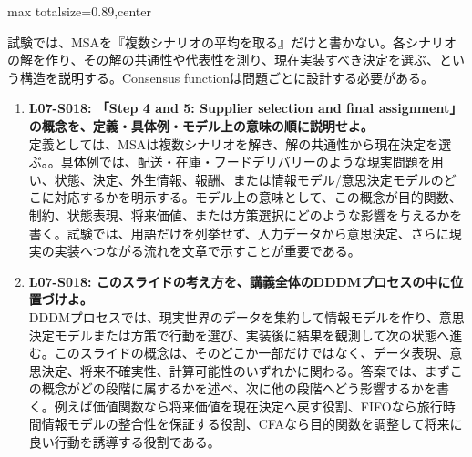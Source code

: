 \begin{minipage}[t]{0.58\textwidth}
\begin{adjustbox}{max totalsize={\textwidth}{0.89\textheight},center}
\begin{minipage}{\textwidth}
試験では、MSAを『複数シナリオの平均を取る』だけと書かない。各シナリオの解を作り、その解の共通性や代表性を測り、現在実装すべき決定を選ぶ、という構造を説明する。Consensus functionは問題ごとに設計する必要がある。\par{}\begin{enumerate}\item \textbf{L07-S018: 「Step 4 and 5: Supplier selection and final assignment」の概念を、定義・具体例・モデル上の意味の順に説明せよ。}\\定義としては、MSAは複数シナリオを解き、解の共通性から現在決定を選ぶ。。具体例では、配送・在庫・フードデリバリーのような現実問題を用い、状態、決定、外生情報、報酬、または情報モデル/意思決定モデルのどこに対応するかを明示する。モデル上の意味として、この概念が目的関数、制約、状態表現、将来価値、または方策選択にどのような影響を与えるかを書く。試験では、用語だけを列挙せず、入力データから意思決定、さらに現実の実装へつながる流れを文章で示すことが重要である。\item \textbf{L07-S018: このスライドの考え方を、講義全体のDDDMプロセスの中に位置づけよ。}\\DDDMプロセスでは、現実世界のデータを集約して情報モデルを作り、意思決定モデルまたは方策で行動を選び、実装後に結果を観測して次の状態へ進む。このスライドの概念は、そのどこか一部だけではなく、データ表現、意思決定、将来不確実性、計算可能性のいずれかに関わる。答案では、まずこの概念がどの段階に属するかを述べ、次に他の段階へどう影響するかを書く。例えば価値関数なら将来価値を現在決定へ戻す役割、FIFOなら旅行時間情報モデルの整合性を保証する役割、CFAなら目的関数を調整して将来に良い行動を誘導する役割である。\end{enumerate}
\end{minipage}
\end{adjustbox}
\end{minipage}


